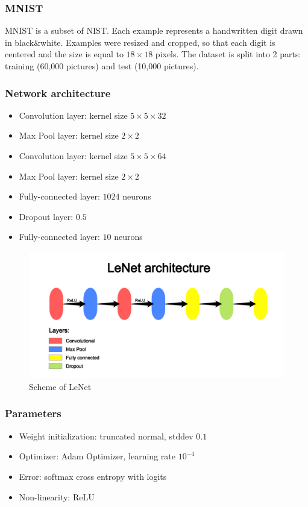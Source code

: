 \documentclass[licencjacka]{pracamgr}
\begin{document}
 		\subsubsection{MNIST}
 			MNIST is a subset of NIST. Each example represents a handwritten digit drawn in black\&white. Examples were resized and cropped, so that each digit is centered and the size is equal to $18\times18$ pixels. The dataset is split into 2 parts: training (60,000 pictures) and test (10,000 pictures).
 		\subsubsection{Network architecture}
 			\begin{itemize}
 			\item Convolution layer: kernel size $5 \times 5 \times 32$
 			\item Max Pool layer: kernel size $2 \times 2$
 			\item Convolution layer: kernel size $5 \times 5 \times 64$
 			\item Max Pool layer: kernel size $2 \times 2$
 			\item Fully-connected layer: $1024$ neurons
 			\item Dropout layer: $0.5$
 			\item Fully-connected layer: $10$ neurons
 			\end{itemize}
 			\begin{figure}[h]
				\caption{Scheme of LeNet}
				\centering
				\includegraphics[width=\textwidth]{LeNet}
			\end{figure}
 		\subsubsection{Parameters}
 			\begin{itemize}
 			\item Weight initialization: truncated normal, stddev $0.1$
 			\item Optimizer: Adam Optimizer, learning rate $10^{-4}$
 			\item Error: softmax cross entropy with logits
 			\item Non-linearity: ReLU
 			\end{itemize}
\end{document}
